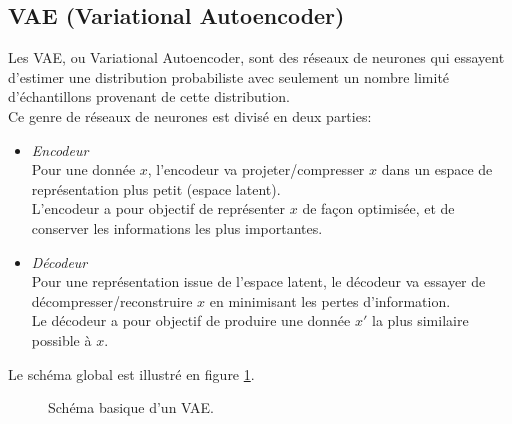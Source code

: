 \begin{appendices}
\section*{VAE (Variational Autoencoder)}\label{app:variational_autoencoder}
Les VAE, ou Variational Autoencoder, sont des réseaux de neurones qui essayent d'estimer une distribution probabiliste avec seulement un nombre limité d'échantillons provenant de cette distribution.\\
Ce genre de réseaux de neurones est divisé en deux parties:\\
\begin{itemize}
	\item \emph{Encodeur}\\
	Pour une donnée $x$, l'encodeur va projeter/compresser $x$ dans un espace de représentation plus petit (espace latent).\\
	L'encodeur a pour objectif de représenter $x$ de façon optimisée, et de conserver les informations les plus importantes.\\
	\item \emph{Décodeur}\\
	Pour une représentation issue de l'espace latent, le décodeur va essayer de décompresser/reconstruire $x$ en minimisant les pertes d'information.\\
	Le décodeur a pour objectif de produire une donnée $x'$ la plus similaire possible à $x$.\\
\end{itemize}
	
Le schéma global est illustré en figure \ref{fig:vae_scheme}.
\begin{figure}[!htbp]
\center
\caption{Schéma basique d'un VAE.}
\label{fig:vae_scheme}
\end{figure}
\FloatBarrier

\end{appendices}

\clearpage

